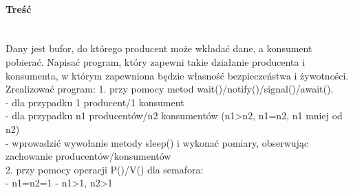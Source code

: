 \paragraph{Treść}~\\
Dany jest bufor, do którego producent może wkładać dane, a konsument pobierać.
Napisać program, który zapewni takie działanie producenta i konsumenta, w którym zapewniona będzie własność bezpieczeństwa i żywotności.
Zrealizować program:
1. przy pomocy metod wait()/notify()/signal()/await().\\
  - dla przypadku 1 producent/1 konsument\\
  - dla przypadku n1 producentów/n2 konsumentów (n1>n2, n1=n2, n1 mniej od n2)\\
  - wprowadzić wywołanie metody sleep() i wykonać pomiary, obserwując zachowanie producentów/konsumentów\\
2. przy pomocy operacji P()/V() dla semafora:\\
  - n1=n2=1
  - n1>1, n2>1














